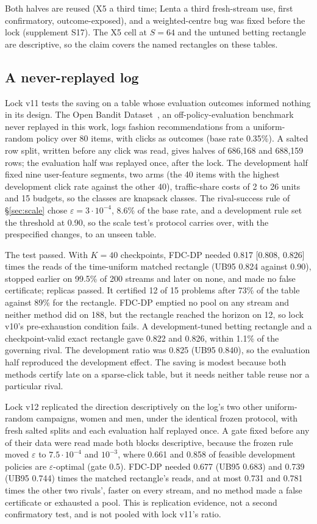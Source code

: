 \documentclass[sigconf,anonymous,review]{acmart}
\newcommand{\eps}{\varepsilon}
\begin{document}
Both halves are reused (X5 a third time; Lenta a third fresh-stream use, first confirmatory, outcome-exposed), and a weighted-centre bug was fixed before the lock (supplement S17). The X5 cell at $S = 64$ and the untuned betting rectangle are descriptive, so the claim covers the named rectangles on these tables.

\subsection{A never-replayed log}\label{sec:obd}

Lock v11 tests the saving on a table whose evaluation outcomes informed nothing in its design. The Open Bandit Dataset~\citep{saito2021open}, an off-policy-evaluation benchmark never replayed in this work, logs fashion recommendations from a uniform-random policy over 80 items, with clicks as outcomes (base rate 0.35\%). A salted row split, written before any click was read, gives halves of 686,168 and 688,159 rows; the evaluation half was replayed once, after the lock. The development half fixed nine user-feature segments, two arms (the 40 items with the highest development click rate against the other 40), traffic-share costs of 2 to 26 units and 15 budgets, so the classes are knapsack classes. The rival-success rule of \S\ref{sec:scale} chose $\eps = 3 \cdot 10^{-4}$, 8.6\% of the base rate, and a development rule set the threshold at 0.90, so the scale test's protocol carries over, with the prespecified changes, to an unseen table.

The test passed. With $K = 40$ checkpoints, FDC-DP needed 0.817 [0.808, 0.826] times the reads of the time-uniform matched rectangle (UB95 0.824 against 0.90), stopped earlier on 99.5\% of 200 streams and later on none, and made no false certificate; replicas passed. It certified 12 of 15 problems after 73\% of the table against 89\% for the rectangle. FDC-DP emptied no pool on any stream and neither method did on 188, but the rectangle reached the horizon on 12, so lock v10's pre-exhaustion condition fails. A development-tuned betting rectangle and a checkpoint-valid exact rectangle gave 0.822 and 0.826, within 1.1\% of the governing rival. The development ratio was 0.825 (UB95 0.840), so the evaluation half reproduced the development effect. The saving is modest because both methods certify late on a sparse-click table, but it needs neither table reuse nor a particular rival.

Lock v12 replicated the direction descriptively on the log's two other uniform-random campaigns, women and men, under the identical frozen protocol, with fresh salted splits and each evaluation half replayed once. A gate fixed before any of their data were read made both blocks descriptive, because the frozen rule moved $\eps$ to $7.5 \cdot 10^{-4}$ and $10^{-3}$, where 0.661 and 0.858 of feasible development policies are $\eps$-optimal (gate 0.5). FDC-DP needed 0.677 (UB95 0.683) and 0.739 (UB95 0.744) times the matched rectangle's reads, and at most 0.731 and 0.781 times the other two rivals', faster on every stream, and no method made a false certificate or exhausted a pool. This is replication evidence, not a second confirmatory test, and is not pooled with lock v11's ratio.
\end{document}

